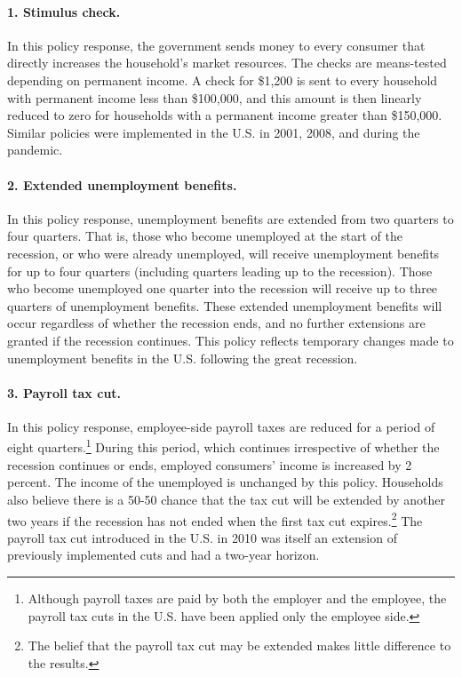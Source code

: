 \documentclass[\PathToRoot/\ProjectName]{subfiles}
\begin{document}
\paragraph{1.
  Stimulus check.} In this policy response, the government sends money to every consumer that directly increases the household's market resources.
The checks are means-tested depending on permanent income.
A check for \$1,200 is sent to every household with permanent income less than \$100,000, and this amount is then linearly reduced to zero for households with a permanent income greater than \$150,000.
Similar policies were implemented in the U.S.
in 2001, 2008, and during the pandemic.

\paragraph{2.
  Extended unemployment benefits.} In this policy response, unemployment benefits are extended from two quarters to four quarters.
That is, those who become unemployed at the start of the recession, or who were already unemployed, will receive unemployment benefits for up to four quarters (including quarters leading up to the recession).
Those who become unemployed one quarter into the recession will receive up to three quarters of unemployment benefits.
These extended unemployment benefits will occur regardless of whether the recession ends, and no further extensions are granted if the recession continues.
This policy reflects temporary changes made to unemployment benefits in the U.S.
following the great recession.

\paragraph{3.
  Payroll tax cut.} In this policy response, employee-side payroll taxes are reduced for a period of eight quarters.\footnote{Although payroll taxes are paid by both the employer and the employee, the payroll tax cuts in the U.S.
  have been applied only the employee side.} During this period, which continues irrespective of whether the recession continues or ends, employed consumers' income is increased by 2 percent.
The income of the unemployed is unchanged by this policy.
Households also believe there is a 50-50 chance that the tax cut will be extended by another two years if the recession has not ended when the first tax cut expires.\footnote{The belief that the payroll tax cut may be extended makes little difference to the results.} The payroll tax cut introduced in the U.S.
in 2010 was itself an extension of previously implemented cuts and had a two-year horizon.
\end{document}

